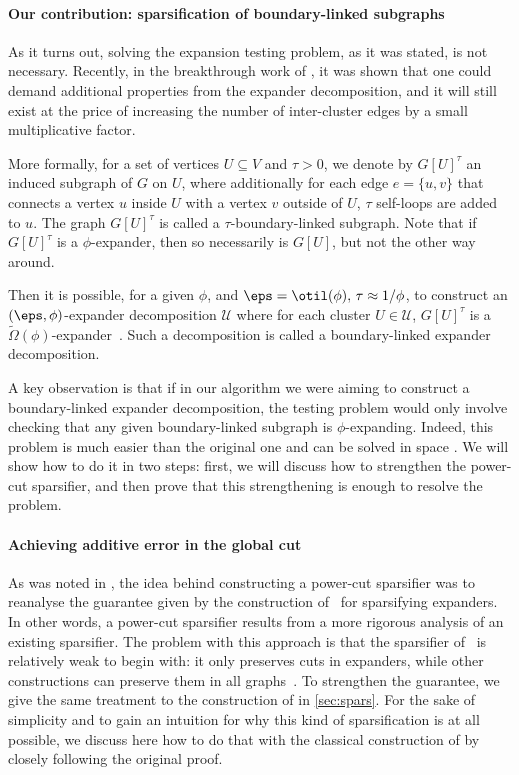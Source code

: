 \paragraph*{Our contribution: sparsification of boundary-linked subgraphs}

As it turns out, solving the expansion testing problem, as it was stated, is not necessary. Recently, in the breakthrough work of \cite{boundlink}, it was shown that one could demand additional properties from the expander decomposition, and it will still exist at the price of increasing the number of inter-cluster edges by a small multiplicative factor.

More formally, for a set of vertices $U \subseteq V$ and $\tau > 0$, we denote by $G[U]^\tau$ an induced subgraph of $G$ on $U$, where additionally for each edge $e=\{u,v\}$ that connects a vertex $u$ inside $U$ with a vertex $v$ outside of $U$, $\tau$ self-loops are added to $u$. The graph $G[U]^\tau$ is called a $\tau$-boundary-linked subgraph. Note that if $G[U]^\tau$ is a $\phi$-expander, then so necessarily is $G[U]$, but not the other way around.


Then it is possible, for a given $\phi$, and $\eps = \otil(\phi), \, \tau \approx 1/\phi$, to construct an $(\eps, \phi)$-expander decomposition $\mathcal{U}$ where for each cluster $U \in \mathcal{U}$, $G[U]^\tau$ is a $ \widetilde{\Omega}(\phi)$-expander~\cite{boundlink}. Such a decomposition is called a boundary-linked expander decomposition.

A key observation is that if in our algorithm we were aiming to construct a boundary-linked expander decomposition, the testing problem would only involve checking that any given boundary-linked subgraph is $\phi$-expanding. Indeed, this problem is much easier than the original one and can be solved in space . We will show how to do it in two steps: first, we will discuss how to strengthen the power-cut sparsifier, and then prove that this strengthening is enough to resolve the problem.

\paragraph*{Achieving additive error in the global cut}
As was noted in \cite{streamexpdec}, the idea behind constructing a power-cut sparsifier was to reanalyse the guarantee given by the construction of~\cite{stspectral} for sparsifying expanders. In other words, a power-cut sparsifier results from a more rigorous analysis of an existing sparsifier. The problem with this approach is that the sparsifier of~\cite{stspectral} is relatively weak to begin with: it only preserves cuts in expanders, while other constructions can preserve them in all graphs~\cite{benczurkarger,fungspars}.
To strengthen the guarantee, we give the same treatment to the construction of \cite{fungspars} in \cref{sec:spars}. For the sake of simplicity and to gain an intuition for why this kind of sparsification is at all possible, we discuss here how to do that with the classical construction of \cite{karger1994random} by closely following the original proof.

